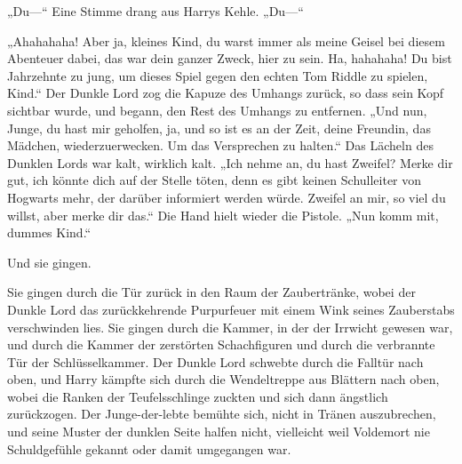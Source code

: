 „Du—“ Eine Stimme drang aus Harrys Kehle. „Du—“

„Ahahahaha! Aber ja, kleines Kind, du warst immer als meine Geisel bei diesem Abenteuer dabei, das war dein ganzer Zweck, hier zu sein. Ha, hahahaha! Du bist Jahrzehnte zu jung, um dieses Spiel gegen den echten Tom Riddle zu spielen, Kind.“
Der Dunkle Lord zog die Kapuze des Umhangs zurück, so dass sein Kopf sichtbar wurde, und begann, den Rest des Umhangs zu entfernen.
„Und nun, Junge, du hast mir geholfen, ja, und so ist es an der Zeit, deine Freundin, das Mädchen, wiederzuerwecken. Um das Versprechen zu halten.“
Das Lächeln des Dunklen Lords war kalt, wirklich kalt.
„Ich nehme an, du hast Zweifel? Merke dir gut, ich könnte dich auf der Stelle töten, denn es gibt keinen Schulleiter von Hogwarts mehr, der darüber informiert werden würde. Zweifel an mir, so viel du willst, aber merke dir das.“
Die Hand hielt wieder die Pistole.
„Nun komm mit, dummes Kind.“

Und sie gingen.

Sie gingen durch die Tür zurück in den Raum der Zaubertränke, wobei der Dunkle Lord das zurückkehrende Purpurfeuer mit einem Wink seines Zauberstabs verschwinden lies. Sie gingen durch die Kammer, in der der Irrwicht gewesen war, und durch die Kammer der zerstörten Schachfiguren und durch die verbrannte Tür der Schlüsselkammer. Der Dunkle Lord schwebte durch die Falltür nach oben, und Harry kämpfte sich durch die Wendeltreppe aus Blättern nach oben, wobei die Ranken der Teufelsschlinge zuckten und sich dann ängstlich zurückzogen.
Der Junge-der-lebte bemühte sich, nicht in Tränen auszubrechen, und seine Muster der dunklen Seite halfen nicht, vielleicht weil Voldemort nie Schuldgefühle gekannt oder damit umgegangen war.

